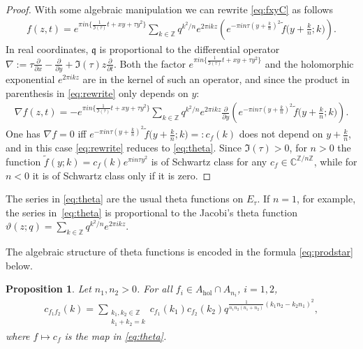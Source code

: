 \documentclass[10pt,a4paper]{amsart}
\numberwithin{equation}{section}
\newtheorem{prop}[thm]{Proposition}
\theoremstyle{definition}
\newcommand{\C}{\mathbb{C}}
\newcommand{\Z}{\mathbb{Z}}
\newcommand{\mf}{\mathfrak}
\newcommand{\gb}{\mf{q}}
\begin{document}
\begin{proof}
With some algebraic manipulation we can rewrite \eqref{eq:fxyC} as follows
\begin{gather}\label{eq:rewrite}
f(z,t)=e^{\pi in\{\frac{1}{\Im(\tau)}t+xy+\tau y^2\}}
\sum_{k\in\Z}q^{k^2/n}e^{2\pi ikz}\left(e^{-\pi in\tau(y+\frac{k}{n})^2}
\widetilde{f}\big(y+\tfrac{k}{n};k\big)\right) .
\end{gather}
In real coordinates, $\gb$ is proportional to the dif\/ferential operator
$\nabla:=\tau\frac{\partial}{\partial x}-\frac{\partial}{\partial y}
+\Im(\tau)z\frac{\partial}{\partial t}$. Both the factor
$e^{\pi in\{\frac{1}{\Im(\tau)}t+xy+\tau y^2\}}$ and the holomorphic exponential $e^{2\pi ikz}$ are in the kernel of such an operator, and since
the product in parenthesis in \eqref{eq:rewrite} only depends on $y$:
\begin{gather*}
\nabla f(z,t)=-e^{\pi in\{\frac{1}{\Im(\tau)}t+xy+\tau y^2\}}
\sum_{k\in\Z}q^{k^2/n}e^{2\pi ikz}
\frac{\partial}{\partial y}\left(e^{-\pi in\tau(y+\frac{k}{n})^2}\widetilde{f}\big(y+\tfrac{k}{n};k\big)\right) .
\end{gather*}
One has $\nabla f=0$ if\/f
$e^{-\pi in\tau(y+\frac{k}{n})^2}\widetilde{f}\big(y+\tfrac{k}{n};k\big)=:c_f(k)$ does not depend on $y+\frac{k}{n}$, and in this case \eqref{eq:rewrite} reduces to
\eqref{eq:theta}. Since $\Im(\tau)>0$,
for $n>0$ the function $\widetilde f(y;k)=c_f(k)e^{\pi in\tau y^2}$ is of Schwartz class for any $c_f\in\C^{\Z/n\Z}$, while for $n<0$ it is of
Schwartz class only if it is zero.
\end{proof}

The series in \eqref{eq:theta} are the usual theta functions on $E_\tau$. If $n=1$, for example, the series in~\eqref{eq:theta} is proportional to the Jacobi's theta function
$\vartheta(z;q)=\sum\limits_{k\in\Z}q^{k^2/n}e^{2\pi ikz}$.

The algebraic structure of theta functions is encoded in the formula \eqref{eq:prodstar} below.

\begin{prop}
Let $n_1,n_2>0$.
For all $f_i\in A_{\mathrm{hol}}\cap A_{n_i}$, $i=1,2$,
\begin{gather}\label{eq:prodstar}
c_{f_1f_2}(k)=
\sum_{\substack{k_1,k_2\in\Z \\[1pt] k_1+k_2=k }}c_{f_1}(k_1)c_{f_2}(k_2)q^{\frac{1}{n_1n_2(n_1+n_2)}(k_1n_2-k_2n_1)^2} ,
\end{gather}
where $f\mapsto c_f$ is the map in \eqref{eq:theta}.
\end{prop}
\end{document}
